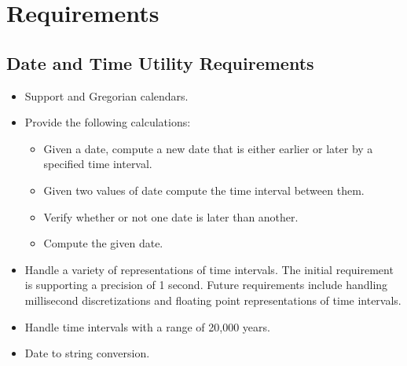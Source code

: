 
\section{Requirements}

\subsection{Date and Time Utility Requirements}

\begin{itemize}

\item Support  and Gregorian calendars.

\item Provide the following calculations:

\begin{itemize}

\item Given a date, compute a new date that is either earlier or later by a specified time interval.

\item Given two values of date compute the time interval between them.

\item Verify whether or not one date is later than another.

\item Compute the  given date.

\end{itemize}

\item Handle a variety of representations of time intervals.  The initial requirement is supporting a 
precision of 1 second.  Future requirements include handling millisecond discretizations and floating 
point representations of time intervals.

\item Handle time intervals with a range of 20,000 years.
 
\item Date to string conversion.
\end{itemize}

